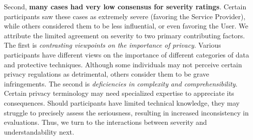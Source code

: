 Second, \textbf{many cases had very low consensus for severity ratings}.
Certain participants saw these cases as extremely severe (favoring the Service Provider), while others considered them to be less influential, or even favoring the User.
We attribute the limited agreement on severity to two primary contributing factors.
The first is \textit{contrasting viewpoints on the importance of privacy}.
Various participants have different views on the importance of different categories of data and protective techniques.
Although some individuals may not perceive certain privacy regulations as detrimental, others consider them to be grave infringements.
The second is \textit{deficiencies in complexity and comprehensibility}.
Certain privacy terminology may need specialized expertise to appreciate its consequences.
Should participants have limited technical knowledge, they may struggle to precisely assess the seriousness, resulting in increased inconsistency in evaluations.
Thus, we turn to the interactions between severity and understandability next.
